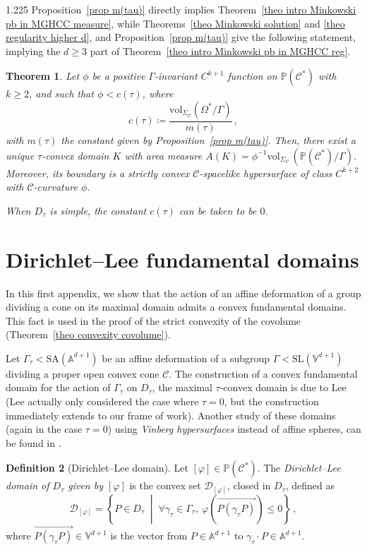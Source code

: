 \documentclass[reqno, a4paper]{amsart}
\numberwithin{equation}{section}
\numberwithin{figure}{section}
\newtheorem{theorem}{Theorem}[section]
\theoremstyle{definition}
\newtheorem{definition}[theorem]{Definition}
\theoremstyle{remark}
\newcommand{\V}{\mathbb{V}} %
\newcommand{\A}{\mathbb{A}} %
\renewcommand{\P}{\mathbb{P}} %
\newcommand{\SL}{\mathrm{SL}} %
\newcommand{\SA}{\mathrm{SA}} %
\newcommand{\C}{\mathcal{C}} %
\renewcommand{\S}{\Sigma_\C} %
\newcommand{\DL}{\mathcal{D}} %
\newcommand{\vol}{\mathrm{vol}} %
\newcommand{\st}{\; \middle\vert \;} %
\newcommand{\vp}[1]{{\left( {#1} \right)}} %
\begin{document}
\begin{spacing}{1.225}
Proposition~\ref{prop m(tau)} directly implies Theorem~\ref{theo intro Minkowski pb in MGHCC measure}, while Theorems~\ref{theo Minkowski solution} and \ref{theo regularity higher d}, and Proposition~\ref{prop m(tau)} give the following statement, implying the $d \geq 3$ part of Theorem~\ref{theo intro Minkowski pb in MGHCC reg}. 

\begin{theorem}
Let $\phi$ be a positive $\Gamma$-invariant $C^{k+1}$ function on $\P(\C^*)$ with $k\geq 2$, and such that $\phi<c(\tau)$, where 
\begin{equation*}
 c(\tau) \coloneqq \frac{\vol_{\S}(\Omega^*/\Gamma)}{m(\tau)} \, ,
\end{equation*}
with $m(\tau)$ the constant given by Proposition~\ref{prop m(tau)}. Then, there exist a unique $\tau$-convex domain $K$ with area measure $A(K) = \phi^{-1} \vol_{\S} \,(\P(\C^*)/\Gamma)$. Moreover, its boundary is a strictly convex $\C$-spacelike hypersurface of class $C^{k+2}$ with $\C$-curvature $\phi$. 

When $D_\tau$ is simple, the constant $c(\tau)$ can be taken to be $0$. 
\end{theorem}

\appendix

\section{Dirichlet--Lee fundamental domains}
\label{app DL domain}

In this first appendix, we show that the action of an affine deformation of a group dividing a cone on its maximal domain admits a convex fundamental domains. This fact is used in the proof of the strict convexity of the covolume (Theorem~\ref{theo convexity covolume}). 

Let $\Gamma_\tau < \SA (\A^{d+1})$ be an affine deformation of a subgroup $\Gamma < \SL (\V^{d+1})$ dividing a proper open convex cone $\C$. The construction of a convex fundamental domain for the action of $\Gamma_\tau$ on $D_\tau$, the maximal $\tau$-convex domain is due to Lee \cite{Lee_08} (Lee actually only considered the case where $\tau=0$, but the construction immediately extends to our frame of work). Another study of these domains (again in the case $\tau=0$) using \emph{Vinberg hypersurfaces} instead of affine spheres, can be found in \cite{Marquis_12}. 

\begin{definition}[Dirichlet--Lee domain]
\label{def DL domain}
Let $[\varphi]\in \P(\C^*)$. The \emph{Dirichlet--Lee domain of $D_\tau$ given by $[\varphi]$} is the convex set $\DL_{[\varphi]}$, closed in $D_\tau$, defined as
\begin{equation*}
 \DL_{[\varphi]} = \left\lbrace P \in D_\tau \st \forall \gamma_\tau \in \Gamma_\tau, \ \varphi\vp{\overrightarrow{P(\gamma_\tau P)}}\leq 0\right\rbrace \, ,
\end{equation*}
where $\overrightarrow{P(\gamma_\tau P)} \in \V^{d+1}$ is the vector from $P \in \A^{d+1}$ to $\gamma_\tau \cdot P\in \A^{d+1}$.
\end{definition}


\end{spacing}
\end{document}
